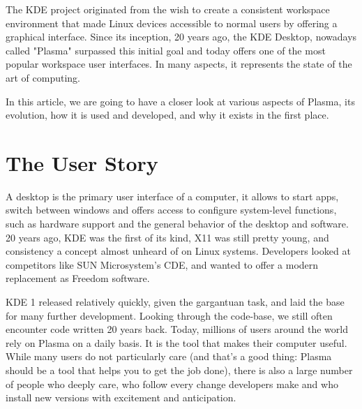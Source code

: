

\noindent{}The KDE project originated from the wish to create a consistent workspace environment that made Linux devices accessible to normal users by offering a graphical interface.
Since its inception, 20 years ago, the KDE Desktop, nowadays called "Plasma" surpassed this initial goal and today offers one of the most popular workspace user interfaces. In many aspects, it represents the state of the art of computing.

In this article, we are going to have a closer look at various aspects of Plasma, its evolution, how it is used and developed, and why it exists in the first place.

\section*{The User Story}

A desktop is the primary user interface of a computer, it allows to start apps, switch between windows and offers access to configure system-level functions, such as hardware support and the general behavior of the desktop and software. 20 years ago, KDE was the first of its kind, X11 was still pretty young, and consistency a concept almost unheard of on Linux systems. Developers looked at competitors like SUN Microsystem's CDE, and wanted to offer a modern replacement as Freedom software.

KDE 1 released relatively quickly, given the gargantuan task, and laid the base for many further development. Looking through the code-base, we still often encounter code written 20 years back.
Today, millions of users around the world rely on Plasma on a daily basis. It is the tool that makes their computer useful. While many users do not particularly care (and that's a good thing: Plasma should be a tool that helps you to get the job done), there is also a large number of people who deeply care, who follow every change developers make and who install new versions with excitement and anticipation.

